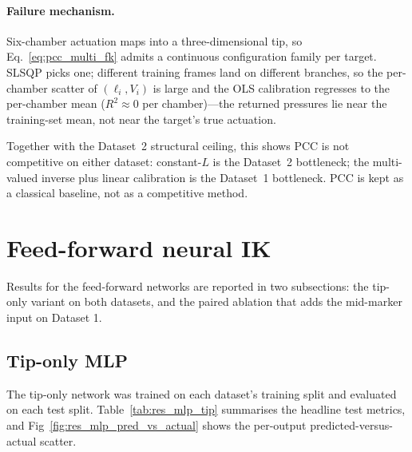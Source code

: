 \paragraph{Failure mechanism.}
Six-chamber actuation maps into a three-dimensional tip, so Eq.~\eqref{eq:pcc_multi_fk} admits a continuous configuration family per target. SLSQP picks one; different training frames land on different branches, so the per-chamber scatter of $(\ell_i, V_i)$ is large and the OLS calibration regresses to the per-chamber mean ($R^{2} \approx 0$ per chamber)---the returned pressures lie near the training-set mean, not near the target's true actuation.

Together with the Dataset~2 structural ceiling, this shows PCC is not competitive on either dataset: constant-$L$ is the Dataset~2 bottleneck; the multi-valued inverse plus linear calibration is the Dataset~1 bottleneck. PCC is kept as a classical baseline, not as a competitive method.

\section{Feed-forward neural IK}
\label{sec:res_mlp}

Results for the feed-forward networks are reported in two subsections: the tip-only variant on both datasets, and the paired ablation that adds the mid-marker input on Dataset 1.

\subsection{Tip-only MLP}
\label{sec:res_mlp_tip}

The tip-only network was trained on each dataset's training split and evaluated on each test split. Table~\ref{tab:res_mlp_tip} summarises the headline test metrics, and Fig~\ref{fig:res_mlp_pred_vs_actual} shows the per-output predicted-versus-actual scatter.

